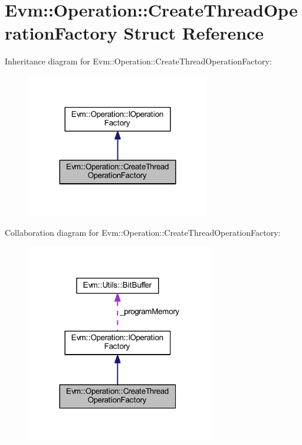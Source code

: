\hypertarget{struct_evm_1_1_operation_1_1_create_thread_operation_factory}{}\section{Evm\+:\+:Operation\+:\+:Create\+Thread\+Operation\+Factory Struct Reference}
\label{struct_evm_1_1_operation_1_1_create_thread_operation_factory}


Inheritance diagram for Evm\+:\+:Operation\+:\+:Create\+Thread\+Operation\+Factory\+:
\nopagebreak
\begin{figure}[H]
\begin{center}
\leavevmode
\includegraphics[width=227pt]{struct_evm_1_1_operation_1_1_create_thread_operation_factory__inherit__graph}
\end{center}
\end{figure}


Collaboration diagram for Evm\+:\+:Operation\+:\+:Create\+Thread\+Operation\+Factory\+:
\nopagebreak
\begin{figure}[H]
\begin{center}
\leavevmode
\includegraphics[width=233pt]{struct_evm_1_1_operation_1_1_create_thread_operation_factory__coll__graph}
\end{center}
\end{figure}
